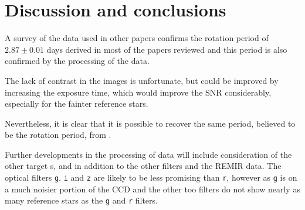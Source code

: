 \section{Discussion and conclusions}
\protect\label{section:discussion}

A survey of the data used in other papers confirms the rotation period of $2.87
\pm 0.01$ days derived in most of the papers reviewed and this period is
also confirmed by the processing of the {\rem} data.

The lack of contrast in the {\rem} images is unfortunate, but could be improved
by increasing the exposure time, which would improve the SNR considerably,
especially for the fainter reference stars.

Nevertheless, it is clear that it is possible to recover the same period,
believed to be the rotation period, from \ross.

Further developments in the processing of {\rem} data will include consideration
of the other target \rdwarf s, {\prox} and {\bstar} in addition to the other
filters and the REMIR data. The optical filters \texttt{g}. \texttt{i} and \texttt{z} are likely to be
less promising than \texttt{r}, however as \texttt{g} is on a much noisier
portion of the CCD and the other too filters do not show nearly as many
reference stars as the \texttt{g} and \texttt{r} filters.

